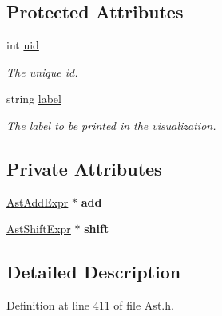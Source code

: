 \subsection*{Protected Attributes}
\begin{DoxyCompactItemize}
\item 
\hypertarget{classAST_a847b778f1c3dd5a19de32de432ee6e15}{int \hyperlink{classAST_a847b778f1c3dd5a19de32de432ee6e15}{uid}}\label{classAST_a847b778f1c3dd5a19de32de432ee6e15}

\begin{DoxyCompactList}\small\item\em The unique id. \end{DoxyCompactList}\item 
\hypertarget{classAST_ab2e239ccc0688d2341724432ff5a1a31}{string \hyperlink{classAST_ab2e239ccc0688d2341724432ff5a1a31}{label}}\label{classAST_ab2e239ccc0688d2341724432ff5a1a31}

\begin{DoxyCompactList}\small\item\em The label to be printed in the visualization. \end{DoxyCompactList}\end{DoxyCompactItemize}
\subsection*{Private Attributes}
\begin{DoxyCompactItemize}
\item 
\hypertarget{classAstShiftExpr_a7f7ae7f658ff3d262824bb9250891512}{\hyperlink{classAstAddExpr}{Ast\-Add\-Expr} $\ast$ {\bfseries add}}\label{classAstShiftExpr_a7f7ae7f658ff3d262824bb9250891512}

\item 
\hypertarget{classAstShiftExpr_a2c841ffbfe9aa7da96c8576a37efbbdf}{\hyperlink{classAstShiftExpr}{Ast\-Shift\-Expr} $\ast$ {\bfseries shift}}\label{classAstShiftExpr_a2c841ffbfe9aa7da96c8576a37efbbdf}

\end{DoxyCompactItemize}


\subsection{Detailed Description}


Definition at line 411 of file Ast.\-h.



